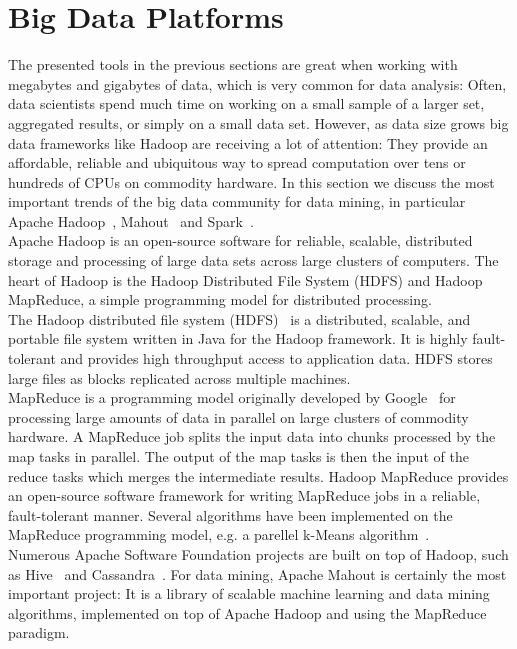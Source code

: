\section{Big Data Platforms}
The presented tools in the previous sections are great when working with megabytes and gigabytes of data, which is very common for data analysis: Often, data scientists spend much time on working on a small sample of a larger set, aggregated results, or simply on a small data set. However, as data size grows big data frameworks like Hadoop are receiving a lot of attention: They provide an affordable, reliable and ubiquitous way to spread computation over tens or hundreds of CPUs on commodity hardware. In this section we discuss the most important trends of the big data community for data mining, in particular Apache Hadoop~\parencite{hadoop}, Mahout~\parencite{mahout} and Spark~\parencite{spark}.
\\
Apache Hadoop is an open-source software for reliable, scalable, distributed storage and processing of large data sets across large clusters of computers. The heart of Hadoop is the Hadoop Distributed File System (HDFS) and Hadoop MapReduce, a simple programming model for distributed processing. 
\\
The Hadoop distributed file system (HDFS)~\parencite{hdfs} is a distributed, scalable, and portable file system written in Java for the Hadoop framework. It is highly fault-tolerant and provides high throughput access to application data. HDFS stores large files as blocks replicated across multiple machines.
\\
MapReduce is a programming model originally developed by Google~\parencite{mapreduce} for processing large amounts of data in parallel on large clusters of commodity hardware. A MapReduce job splits the input data into chunks processed by the map tasks in parallel. The output of the map tasks is then the input of the reduce tasks which merges the intermediate results. Hadoop MapReduce provides an open-source software framework for writing MapReduce jobs in a reliable, fault-tolerant manner. 
Several algorithms have been implemented on the MapReduce programming model, e.g. a parellel k-Means algorithm~\parencite{parallelkmeans}. 
\\
Numerous Apache Software Foundation projects are built on top of Hadoop, such as Hive~\parencite{hive} and Cassandra~\parencite{cassandra}. For data mining, Apache Mahout is certainly the most important project: It is a library of scalable machine learning and data mining algorithms, implemented on top of Apache Hadoop and using the MapReduce paradigm. 

